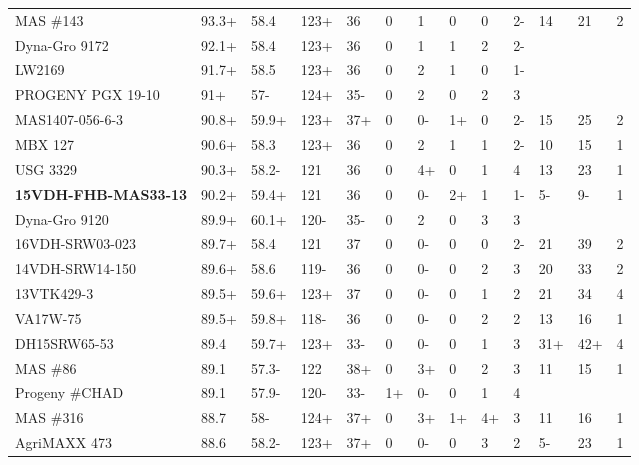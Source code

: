 \documentclass[12pt, letterpaper]{article}
\begin{document}
\begin{landscape}
\begin{ThreePartTable}
\begin{longtable}{lllllllllllll}
MAS \#143 & 93.3+ & 58.4 & 123+ & 36 & 0 & 1 & 0 & 0 & 2- & 14 & 21 & 2 \\ 
  Dyna-Gro 9172 & 92.1+ & 58.4 & 123+ & 36 & 0 & 1 & 1 & 2 & 2- &  &  &  \\ 
  LW2169 & 91.7+ & 58.5 & 123+ & 36 & 0 & 2 & 1 & 0 & 1- &  &  &  \\ 
  PROGENY PGX 19-10 & 91+ & 57- & 124+ & 35- & 0 & 2 & 0 & 2 & 3 &  &  &  \\ 
  MAS1407-056-6-3 & 90.8+ & 59.9+ & 123+ & 37+ & 0 & 0- & 1+ & 0 & 2- & 15 & 25 & 2 \\ 
  MBX 127 & 90.6+ & 58.3 & 123+ & 36 & 0 & 2 & 1 & 1 & 2- & 10 & 15 & 1 \\ 
  USG 3329 & 90.3+ & 58.2- & 121 & 36 & 0 & 4+ & 0 & 1 & 4 & 13 & 23 & 1 \\ 
  \textbf{15VDH-FHB-MAS33-13} & 90.2+ & 59.4+ & 121 & 36 & 0 & 0- & 2+ & 1 & 1- & 5- & 9- & 1 \\ 
  Dyna-Gro 9120 & 89.9+ & 60.1+ & 120- & 35- & 0 & 2 & 0 & 3 & 3 &  &  &  \\ 
  16VDH-SRW03-023 & 89.7+ & 58.4 & 121 & 37 & 0 & 0- & 0 & 0 & 2- & 21 & 39 & 2 \\ 
  14VDH-SRW14-150 & 89.6+ & 58.6 & 119- & 36 & 0 & 0- & 0 & 2 & 3 & 20 & 33 & 2 \\ 
  13VTK429-3 & 89.5+ & 59.6+ & 123+ & 37 & 0 & 0- & 0 & 1 & 2 & 21 & 34 & 4 \\ 
  VA17W-75 & 89.5+ & 59.8+ & 118- & 36 & 0 & 0- & 0 & 2 & 2 & 13 & 16 & 1 \\ 
  DH15SRW65-53 & 89.4 & 59.7+ & 123+ & 33- & 0 & 0- & 0 & 1 & 3 & 31+ & 42+ & 4 \\ 
  MAS \#86 & 89.1 & 57.3- & 122 & 38+ & 0 & 3+ & 0 & 2 & 3 & 11 & 15 & 1 \\ 
  Progeny \#CHAD & 89.1 & 57.9- & 120- & 33- & 1+ & 0- & 0 & 1 & 4 &  &  &  \\ 
  MAS \#316 & 88.7 & 58- & 124+ & 37+ & 0 & 3+ & 1+ & 4+ & 3 & 11 & 16 & 1 \\ 
  AgriMAXX 473 & 88.6 & 58.2- & 123+ & 37+ & 0 & 0- & 0 & 3 & 2 & 5- & 23 & 1 \\ 

\end{longtable}
\end{ThreePartTable}
\end{landscape}
\end{document}
